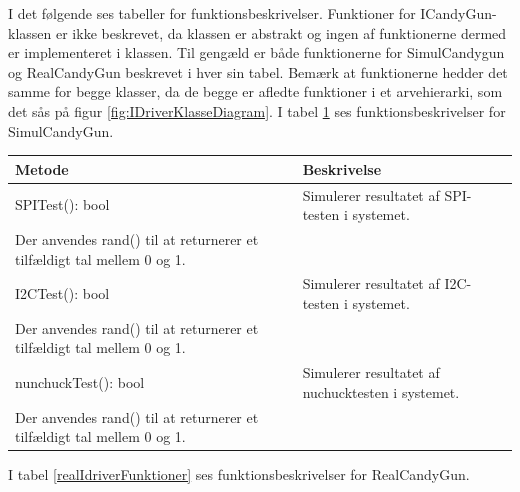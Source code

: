 I det følgende ses tabeller for funktionsbeskrivelser. Funktioner for ICandyGun-klassen er ikke beskrevet, da klassen er abstrakt og ingen af funktionerne dermed er implementeret i klassen. Til gengæld er både funktionerne for SimulCandygun og RealCandyGun beskrevet i hver sin tabel. Bemærk at funktionerne hedder det samme for begge klasser, da de begge er afledte funktioner i et arvehierarki, som det sås på figur \ref{fig:IDriverKlasseDiagram}.  
I tabel \ref{SimulFunktioner} ses funktionsbeskrivelser for SimulCandyGun. 

\begin{table}[H]
	\centering
	\label{SimulFunktioner}
	\begin{tabular}{|l|l|}
		\hline
		\textbf{Metode}      & \textbf{Beskrivelse}                                                                                                     \\ \hline
		SPITest(): bool      & Simulerer resultatet af SPI-testen i systemet. \\ Der anvendes rand() til at returnerer et tilfældigt tal mellem 0 og 1.    \\ \hline
		I2CTest(): bool      & Simulerer resultatet af I2C-testen i systemet. \\ Der anvendes rand() til at returnerer et tilfældigt tal mellem 0 og 1.    \\ \hline
		nunchuckTest(): bool & Simulerer resultatet af nuchucktesten i systemet. \\ Der anvendes rand() til at returnerer et tilfældigt tal mellem 0 og 1. \\ \hline
	\end{tabular}
\end{table}


I tabel \ref{realIdriverFunktioner} ses funktionsbeskrivelser for RealCandyGun.

